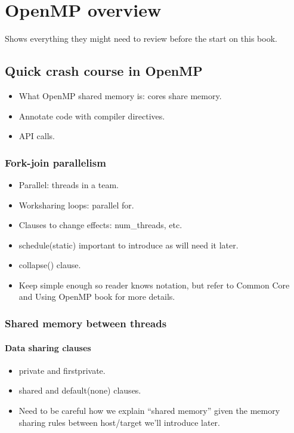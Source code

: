 
\chapter{OpenMP overview}
\label{chapter:overview}

Shows everything they might need to review before the start on this book.

\section{Quick crash course in OpenMP}
\begin{itemize}
  \item What OpenMP shared memory is: cores share memory.
  \item Annotate code with compiler directives.
  \item API calls.
\end{itemize}

\subsection{Fork-join parallelism}
\begin{itemize}
  \item Parallel: threads in a team.
  \item Worksharing loops: parallel for.
  \item Clauses to change effects: num\_threads, etc.
  \item schedule(static) important to introduce as will need it later.
  \item collapse() clause.
  \item Keep simple enough so reader knows notation, but refer to Common Core and Using OpenMP book for more details.
\end{itemize}

\subsection{Shared memory between threads}
\subsubsection{Data sharing clauses}
\begin{itemize}
  \item private and firstprivate.
  \item shared and default(none) clauses.
  \item Need to be careful how we explain “shared memory” given the memory sharing rules between host/target we’ll introduce later.
\end{itemize}

